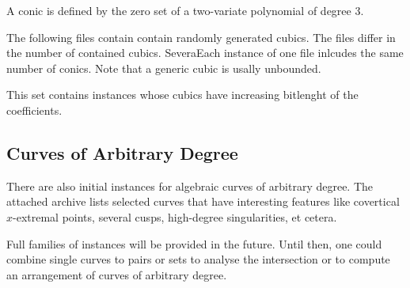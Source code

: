 A conic is defined by the zero set of a two-variate polynomial
of degree 3. 

The following files contain contain randomly generated cubics. The
files differ in the number of contained cubics.
SeveraEach instance of one file inlcudes the same number of conics. Note 
that a generic cubic is usally unbounded.

This set contains instances whose cubics have increasing bitlenght of the
coefficients.


\subsection{Curves of Arbitrary Degree\label{bi_ssec:AlgebraicCurve2}}

There are also initial instances for algebraic curves of arbitrary degree.
The attached archive
lists selected curves that have interesting features like covertical 
$x$-extremal points, several cusps, high-degree singularities, et cetera.


Full families of instances will be provided in the future. Until then,
one could combine single curves to pairs or sets to analyse the intersection
or to compute an arrangement of curves of arbitrary degree.

